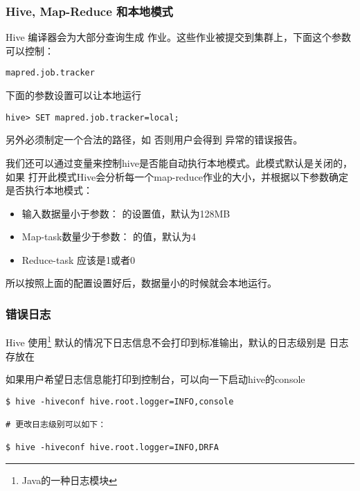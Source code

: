 \documentclass{article}
\begin{document}
\subsubsection{Hive, Map-Reduce 和本地模式}
Hive 编译器会为大部分查询生成 作业。这些作业被提交到集群上，下面这个参数可以控制：

\begin{verbatim}
mapred.job.tracker
\end{verbatim}

下面的参数设置可以让本地运行

\begin{verbatim}
hive> SET mapred.job.tracker=local;
\end{verbatim}

另外必须制定一个合法的路径，如 否则用户会得到
异常的错误报告。

我们还可以通过变量来控制hive是否能自动执行本地模式。此模式默认是关闭的，如果
打开此模式Hive会分析每一个map-reduce作业的大小，并根据以下参数确定是否执行本地模式：

\begin{itemize}
\item 输入数据量小于参数： 的设置值，默认为128MB
\item Map-task数量少于参数： 的值，默认为4
\item Reduce-task 应该是1或者0
\end{itemize}

所以按照上面的配置设置好后，数据量小的时候就会本地运行。

\subsubsection{错误日志}
Hive 使用\footnote{Java的一种日志模块} 默认的情况下日志信息不会打印到标准输出，默认的日志级别是
 日志存放在

如果用户希望日志信息能打印到控制台，可以向一下启动hive的console

\begin{verbatim}
$ hive -hiveconf hive.root.logger=INFO,console

# 更改日志级别可以如下：

$ hive -hiveconf hive.root.logger=INFO,DRFA
\end{verbatim}
\end{document}
